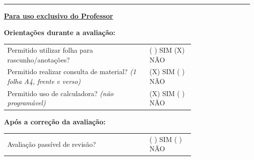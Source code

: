\vspace{-0.5em}
\noindent\rule{\linewidth}{0.6pt}

\underline{\textbf{Para uso exclusivo do Professor}}

\begin{footnotesize}
\textbf{Orientações durante a avaliação:}

\renewcommand{\arraystretch}{1.1}
\begin{tabular}{@{}p{0.76\linewidth}@{}l@{}}
Permitido utilizar folha para rascunho/anotações? & ( ) SIM \quad (X) NÃO \\
Permitido realizar consulta de material? \emph{(1 folha A4, frente e verso)} & (X) SIM \quad ( ) NÃO \\
Permitido uso de calculadora? \emph{(não programável)} & (X) SIM \quad ( ) NÃO \\
\end{tabular}

\textbf{Após a correção da avaliação:}

\begin{tabular}{@{}p{0.76\linewidth}@{}l@{}}
Avaliação passível de revisão? & ( ) SIM \quad ( ) NÃO \\
\end{tabular}
\end{footnotesize}
\endgroup

\fi
\clearpage
